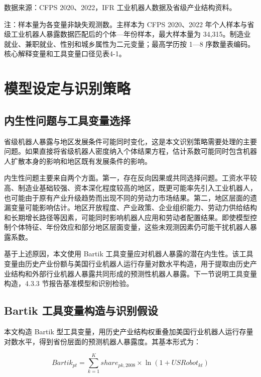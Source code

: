 \documentclass[UTF8, zihao=-4, a4paper, openany, fontset=none]{ctexrep}
\numberwithin{equation}{chapter}
\begin{document}
数据来源：CFPS 2020、2022，IFR 工业机器人数据及省级产业结构资料。

注：样本量为各变量非缺失观测数。主样本为 CFPS 2020、2022 年个人样本与省级工业机器人暴露数据匹配后的个体---年份样本，最大样本量为 34,315。制造业就业、兼职就业、性别和城乡属性为二元变量；最高学历按 1---8 序数量表编码。核心解释变量和工具变量口径见表4-1。

\section{模型设定与识别策略}\label{ux6a21ux578bux8bbeux5b9aux4e0eux8bc6ux522bux7b56ux7565}

\subsection{内生性问题与工具变量选择}\label{ux5185ux751fux6027ux95eeux9898ux4e0eux5de5ux5177ux53d8ux91cfux9009ux62e9}

省级机器人暴露与地区发展条件可能同时变化，这是本文识别策略需要处理的主要问题。如果直接将省级机器人密度纳入个体结果方程，估计系数可能同时包含机器人扩散本身的影响和地区既有发展条件的影响。

内生性问题主要来自两个方面。第一，存在反向因果或共同选择问题。工资水平较高、制造业基础较强、资本深化程度较高的地区，既更可能率先引入工业机器人，也可能由于原有产业升级趋势而出现不同的劳动力市场结果。第二，地区层面的遗漏变量可能影响估计。地区开放程度、产业政策、企业组织能力、劳动力供给结构和长期增长路径等因素，可能同时影响机器人应用和劳动者配置结果。即使模型控制个体特征、年份效应和部分地区层面变量，这些未观测因素仍可能干扰机器人暴露系数。

基于上述原因，本文使用 Bartik 工具变量应对机器人暴露的潜在内生性。该工具变量由历史产业份额与美国行业机器人运行存量对数水平构造，用于提取由历史产业结构和外部行业机器人暴露共同形成的预测性机器人暴露。下一节说明工具变量构造，4.3.3 节报告基准模型和识别检验。

\subsection{Bartik 工具变量构造与识别假设}\label{bartik-ux5de5ux5177ux53d8ux91cfux6784ux9020ux4e0eux8bc6ux522bux5047ux8bbe}

本文构造 Bartik 型工具变量，用历史产业结构权重叠加美国行业机器人运行存量对数水平，得到省份层面的预测机器人暴露度。其基本形式为：

\[
Bartik_{pt}=\sum_{k=1}^{K} share_{pk,2008}\times \ln(1+USRobot_{kt})
\]
\end{document}
